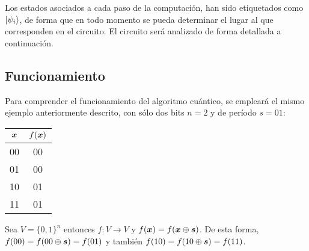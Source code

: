 Los estados asociados a cada paso de la computación, han sido etiquetados como 
$\ket{\psi_i}$, de forma que en todo momento se pueda determinar el lugar al que 
corresponden en el circuito. El circuito será analizado de forma detallada a 
continuación.

\subsection{Funcionamiento}
Para comprender el funcionamiento del algoritmo cuántico, se empleará el mismo 
ejemplo anteriormente descrito, con sólo dos bits $n=2$ y de período $s=01$:
%
\begin{center}
\begin{tabular}{cc}
	\toprule
	$\boldsymbol{x}$ & $f(\boldsymbol{x})$ \\
	\midrule
	00 & 00 \\
	01 & 00 \\
	10 & 01 \\
	11 & 01 \\
	\bottomrule
\end{tabular}
\end{center}
%
Sea $V = \{0,1\}^n$ entonces $f:V\rightarrow V$ y $f(\boldsymbol{x}) = f(\boldsymbol{x}\oplus \boldsymbol{s})$. De esta 
forma, $f(00) = f(00 \oplus \boldsymbol{s}) = f(01)$ y también $f(10) = f(10 \oplus \boldsymbol{s}) = 
f(11)$.

